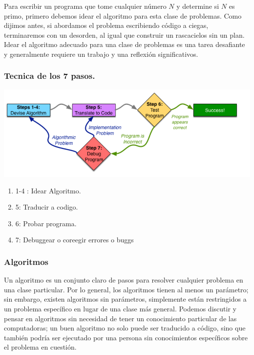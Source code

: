 \documentclass[12pt]{article}
\begin{document}
Para escribir un programa que tome cualquier número $N$ y determine si $N$ es primo, primero debemos idear el algoritmo para esta clase de problemas. Como dijimos antes, si abordamos el problema escribiendo código a ciegas, terminaremos con un desorden, al igual que construir un rascacielos sin un plan. Idear el algoritmo adecuado para una clase de problemas es una tarea desafiante y generalmente requiere un trabajo y una reflexión significativos.\\

{\color{blue} \subsubsection*{\textbf{Tecnica de los 7 pasos.}}}

\textbf{\includegraphics[scale = 0.55]{images/7 pasos.png}}\\

\begin{enumerate}
    \item 1-4 : Idear Algoritmo.
    \item 5: Traducir a codigo.
    \item 6: Probar programa.
    \item 7: Debuggear o coreegir errores o buggs
\end{enumerate}

{\color{blue} \subsubsection*{\textbf{Algoritmos}}}

Un algoritmo es un conjunto claro de pasos para resolver cualquier problema en una clase particular. Por lo general, los algoritmos tienen al menos un parámetro; sin embargo, existen algoritmos sin parámetros, simplemente están restringidos a un problema específico en lugar de una clase más general. Podemos discutir y pensar en algoritmos sin necesidad de tener un conocimiento particular de las computadoras; un buen algoritmo no solo puede ser traducido a código, sino que también podría ser ejecutado por una persona sin conocimientos específicos sobre el problema en cuestión.\\
\end{document}
